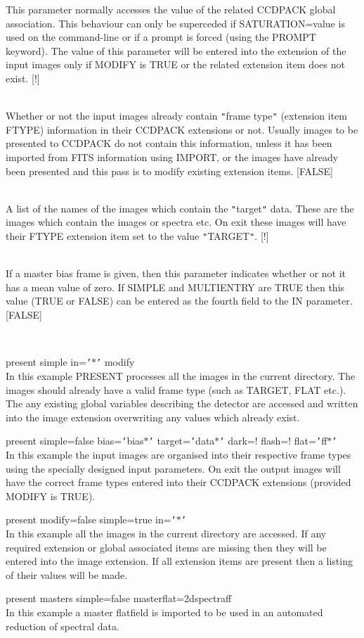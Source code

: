 \documentclass[twoside,11pt]{article}
\newcommand{\htmlref}[2]{#1}
\renewcommand{\_}{\texttt{\symbol{95}}}
\newcommand{\qt}[1]{{\tt "}#1{\tt "}}
\newcommand{\qs}[1]{{\tt '}#1{\tt '}}
\newcommand{\routine}[1]{{\sc #1}}
\newcommand{\xroutine}[1]{\htmlref{{\sc #1}}{#1}}
\newcommand{\sstexamples}[1]{
   \item[Examples:] \mbox{} \\
   \vspace{-3.5ex}
   \begin{description}
      #1
   \end{description}
}
\newcommand{\sstsubsection}[1]{ \item[{#1}] \mbox{} \\}
\newcommand{\sstexamplesubsection}[2]{\sloppy \item{\ssttt #1} \mbox{} \\ #2 }
\newcommand{\sstexamples}[1]{
      \item[Examples:] \\
      \begin{description}
         #1
      \end{description}
      \\
   }
\newcommand{\sstsubsection}[1]{\item[{#1}]}
\newcommand{\sstexamplesubsection}[2]{\item[{\ssttt #1}] #2}
\begin{document}
{{{         This parameter normally accesses the value of the related
         CCDPACK global association. This behaviour can only be
         superceded if SATURATION=value is used on the command-line
         or if a prompt is forced (using the PROMPT keyword). The
         value of this parameter will be entered into the extension of
         the input images only if MODIFY is TRUE or the related extension
         item does not exist.
         [!]
      }
      \sstsubsection{
         SIMPLE = \_LOGICAL (Read)
      } {
         Whether or not the input images already contain \qt{frame type}
         (extension item FTYPE) information in their CCDPACK extensions
         or not. Usually images to be presented to CCDPACK do not contain
         this information, unless it has been imported from FITS
         information using \xroutine{IMPORT}, or the images have already been
         presented and this pass is to modify existing extension items.
         [FALSE]
      }
      \sstsubsection{
         TARGET = LITERAL (Read)
      } {
         A list of the names of the images which contain the \qt{target}
         data. These are the images which contain the images or spectra
         etc.  On exit these images will have their FTYPE extension item
         set to the value \qt{TARGET}.
         [!]
      }
      \sstsubsection{
         ZEROED = \_LOGICAL (Read)
      } {
         If a master bias frame is given, then this parameter indicates
         whether or not it has a mean value of zero. If SIMPLE and
         MULTIENTRY are TRUE then this value (TRUE or FALSE) can be entered
         as the fourth field to the IN parameter.
         [FALSE]
      }
   }
\newpage
   \sstexamples{
      \sstexamplesubsection{
         present simple in=\qs{$*$} modify
      } {
         In this example \routine{PRESENT} processes all the images in the current
         directory. The images should already have a valid frame type
         (such as TARGET, FLAT etc.). The any existing global variables
         describing the detector are accessed and written into the image
         extension overwriting any values which already exist.
      }
      \sstexamplesubsection{
         present simple=false bias=\qs{bias$*$} target=\qs{data$*$}
                 dark=! flash=! flat=\qs{ff$*$}
      } {
         In this example the input images are organised into their
         respective frame types using the specially designed input
         parameters. On exit the output images will have the correct frame
         types entered into their CCDPACK extensions (provided MODIFY
         is TRUE).
      }
      \sstexamplesubsection{
         present modify=false simple=true in=\qs{$*$}
      } {
         In this example all the images in the current directory are
         accessed. If any required extension or global associated items
         are missing then they will be entered into the image extension.
         If all extension items are present then a listing of their
         values will be made.
      }
      \sstexamplesubsection{
         present masters simple=false masterflat=2dspectraff
      } {
         In this example a master flatfield is imported to be used
         in an automated reduction of spectral data.
      }
   }
}
\end{document}
